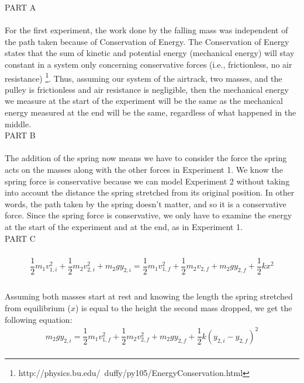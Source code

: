 \documentclass [12pt, letterpaper, twoside] {article}
\begin{document}
PART A \\\\
For the first experiment, the work done by the falling mass was independent of the path taken because of Conservation of Energy. The Conservation of Energy states that the sum of kinetic and potential energy (mechanical energy) will stay constant in a system only concerning conservative forces (i.e., frictionless, no air resistance) \footnote{http://physics.bu.edu/~duffy/py105/EnergyConservation.html}. Thus, assuming our system of the airtrack, two masses, and the pulley is frictionless and air resistance is negligible, then the mechanical energy we measure at the start of the experiment will be the same as the mechanical energy measured at the end will be the same, regardless of what happened in the middle. \\

\noindent
PART B \\\\
The addition of the spring now means we have to consider the force the spring acts on the masses along with the other forces in Experiment 1. We know the spring force is conservative because we can model Experiment 2 without taking into account the distance the spring stretched from its original position. In other words, the path taken by the spring doesn't matter, and so it is a conservative force. Since the spring force is conservative, we only have to examine the energy at the start of the experiment and at the end, as in Experiment 1. \\

\noindent
PART C \\\\
\begin {equation*}
  \begin {split}
     \dfrac{1}{2}m_{1}v_{1,i}^2 + \dfrac{1}{2}m_{2}v_{2,i}^2 + m_{2}gy_{2,i} = \dfrac{1}{2}m_{1}v_{1,f}^2 + \dfrac{1}{2}m_{2}v_{2,f} + m_{2}gy_{2,f} + \dfrac{1}{2}kx^2 \\
  \end {split}
\end {equation*} \\
Assuming both masses start at rest and knowing the length the spring stretched from equilibrium (\(x\)) is equal to the height the second mass dropped, we get the following equation:
\begin {equation*}
  \begin {split}
     m_{2}gy_{2,i} = \dfrac{1}{2}m_{1}v_{1,f}^2 + \dfrac{1}{2}m_{2}v_{2,f}^2 + m_{2}gy_{2,f} + \dfrac{1}{2}k(y_{2,i} - y_{2,f})^2 \\
  \end {split}
\end {equation*}
\end{document}

